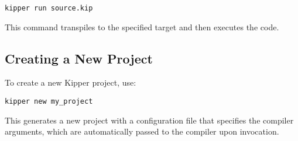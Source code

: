 \begin{lstlisting}[language=Shell,caption=Running a Kipper file, label=lst:cli_run]
kipper run source.kip
\end{lstlisting}

This command \gls{transpile}s to the specified target and then executes the code.

\subsection{Creating a New Project}
\label{subsec:cli-new_project}

To create a new Kipper project, use:

\begin{lstlisting}[language=Shell,caption=Creating a new Kipper project with a default file setup and config file, label=lst:cli_new_project]
kipper new my_project
\end{lstlisting}

This generates a new project with a configuration file that specifies the compiler arguments, which are automatically passed to the compiler upon invocation.

